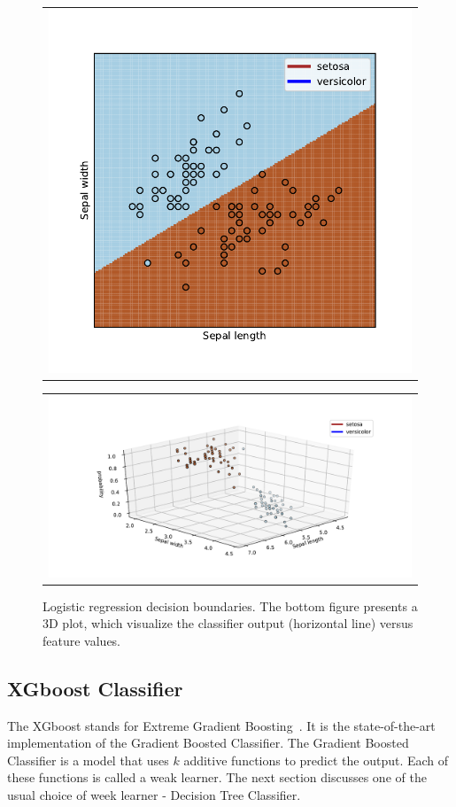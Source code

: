 \begin{figure}
  \centering
  \begin{tabular}{@{}c@{}}
    \includegraphics[width=0.6\linewidth]{figures/decision_boundaries_lr.pdf}
  \end{tabular}

  \vspace{\floatsep}

  \begin{tabular}{@{}c@{}}
    \includegraphics[width=\linewidth]{figures/3D_log_reg.pdf}
  \end{tabular}

  \caption{Logistic regression decision boundaries. The bottom figure presents a 3D plot, which visualize the classifier output (horizontal line) versus feature values.  
\label{fig:LRdecision boundary}}  
\end{figure}



\subsection{XGboost Classifier}
\label{sec:xgboost}
The XGboost stands for Extreme Gradient Boosting~\cite{xgboost}. It is the state-of-the-art implementation of the Gradient Boosted Classifier. The Gradient Boosted Classifier is a model that uses $k$ additive functions to predict the output.  
Each of these functions is called a weak learner. The next section discusses one of the usual choice of week learner - Decision Tree Classifier. 


